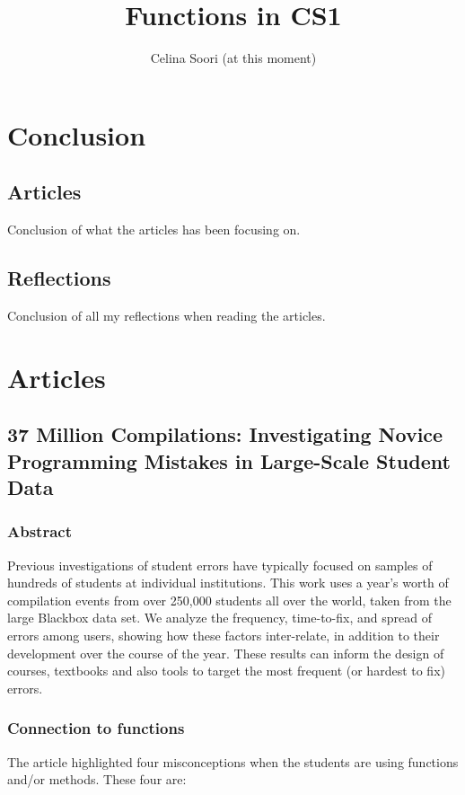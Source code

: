 \documentclass[11pt]{article} %
\title{Functions in CS1}
\author{Celina Soori (at this moment)}
\begin{document}
\maketitle

\section{Conclusion}

\subsection{Articles}

Conclusion of what the articles has been focusing on.

\subsection{Reflections}

Conclusion of all my reflections when reading the articles. 

\section{Articles}

\subsection{37 Million Compilations: Investigating Novice Programming Mistakes in Large-Scale Student Data}

\subsubsection{Abstract}
Previous investigations of student errors have typically focused on samples of hundreds of students at individual institutions. This work uses a year's worth of compilation events from over 250,000 students all over the world, taken from the large Blackbox data set. We analyze the frequency, time-to-fix, and spread of errors among users, showing how these factors inter-relate, in addition to their development over the course of the year. These results can inform the design of courses, textbooks and also tools to target the most frequent (or hardest to fix) errors.

\subsubsection{Connection to functions}
The article highlighted four misconceptions when the students are using functions and/or methods. These four are:
\end{document}
